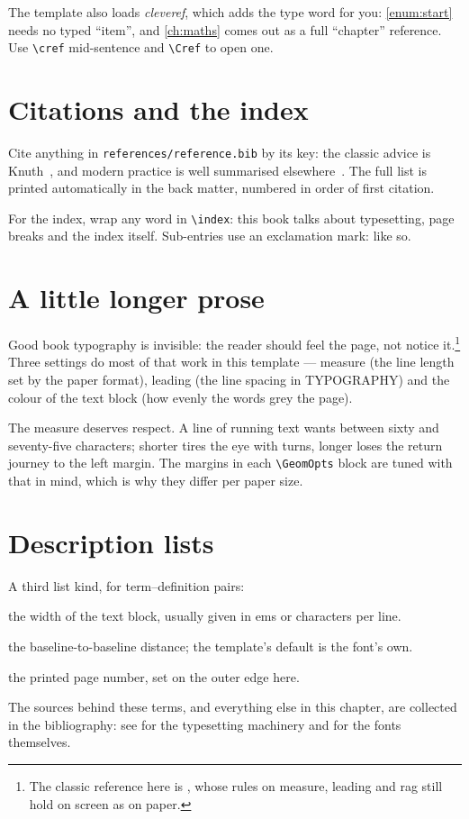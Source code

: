 The template also loads \emph{cleveref}, which adds the type word
for you: \cref{enum:start} needs no typed ``item'', and
\cref{ch:maths} comes out as a full ``chapter'' reference. Use
\texttt{\textbackslash cref} mid-sentence and \texttt{\textbackslash Cref} to open one.

\section{Citations and the index}
Cite anything in \texttt{references/reference.bib} by its key: the
classic advice is Knuth~\cite{knuth1984}, and modern practice is well
summarised elsewhere~\cite{lamport1994, mittal2005}. The full list is
printed automatically in the back matter, numbered in order of first
citation.

For the index, wrap any word in \texttt{\textbackslash index}: this book talks about
typesetting, page breaks and
the index itself. Sub-entries use an exclamation mark:
like so.

\section{A little longer prose}\label{sec:prose}
Good book typography is invisible: the reader should feel the page,
not notice it.\footnote{The classic reference here is
\textcite{bringhurst2004}, whose rules on measure, leading and rag
still hold on screen as on paper.} Three settings do most of that
work in this template --- measure (the line length set by the paper
format), leading (the line spacing in TYPOGRAPHY) and the colour of
the text block (how evenly the words grey the page).

The measure deserves respect. A line of running text wants between
sixty and seventy-five characters; shorter tires the eye with turns,
longer loses the return journey to the left margin. The margins in
each \texttt{\textbackslash GeomOpts} block are tuned with
that in mind, which is why they differ per paper size.

\section{Description lists}
A third list kind, for term--definition pairs:

\begin{description}[itemsep=2pt]
  \item[Measure] the width of the text block, usually given in ems or
    characters per line.
  \item[Leading] the baseline-to-baseline distance; the template's
    default is the font's own.
  \item[Folio] the printed page number, set on the outer edge here.
\end{description}

\noindent
The sources behind these terms, and everything else in this chapter,
are collected in the bibliography: see \parencite{knuth1984,
lamport1994} for the typesetting machinery and \textcite{texgyre}
for the fonts themselves.
